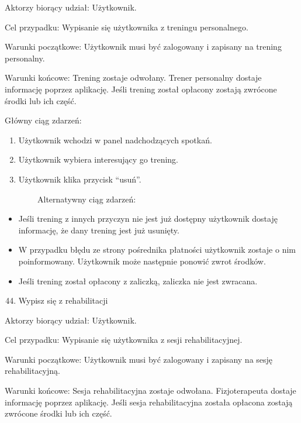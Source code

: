 \documentclass[
]{article}
\providecommand{\tightlist}{%
  \setlength{\itemsep}{0pt}\setlength{\parskip}{0pt}}
\begin{document}
{Aktorzy biorący udział: Użytkownik.}

{Cel przypadku: Wypisanie się użytkownika z treningu personalnego.}

{Warunki początkowe: Użytkownik musi być zalogowany i zapisany na
trening personalny. }

{Warunki końcowe: Trening zostaje odwołany. Trener personalny dostaje
informację poprzez aplikację. Jeśli trening został opłacony zostają
zwrócone środki lub ich część.}

{Główny ciąg zdarzeń: }

\begin{enumerate}
\tightlist
\item
  {Użytkownik wchodzi w panel nadchodzących spotkań.}
\item
  {Użytkownik wybiera interesujący go trening.}
\item
  {Użytkownik klika przycisk ``usuń''.}
\end{enumerate}

{~~~~~~~~Alternatywny ciąg zdarzeń:}

\begin{itemize}
\tightlist
\item
  {Jeśli trening z innych przyczyn nie jest już dostępny użytkownik
  dostaję informację, że dany trening jest już usunięty.}
\item
  {W przypadku błędu ze strony pośrednika płatności użytkownik zostaje o
  nim poinformowany. Użytkownik może następnie ponowić zwrot środków.}
\item
  {Jeśli trening został opłacony z zaliczką, zaliczka nie jest
  zwracana.}
\end{itemize}

{}

\begin{enumerate}
\setcounter{enumi}{43}
\tightlist
\item
  {Wypisz się z rehabilitacji}
\end{enumerate}

{Aktorzy biorący udział: Użytkownik.}

{Cel przypadku: Wypisanie się użytkownika z sesji rehabilitacyjnej.}

{Warunki początkowe: Użytkownik musi być zalogowany i zapisany na sesję
rehabilitacyjną. }

{Warunki końcowe: Sesja rehabilitacyjna zostaje odwołana. Fizjoterapeuta
dostaje informację poprzez aplikację. Jeśli sesja rehabilitacyjna
została opłacona zostają zwrócone środki lub ich część.}
\end{document}
